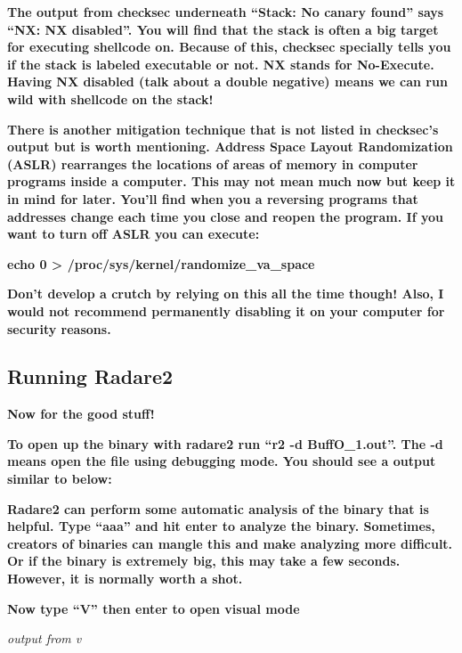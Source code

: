 \documentclass[letterpaper]{article}
\newcommand{\sitfig}[3]{
\begin{figure}[H]
\centering
\makebox[\textwidth][c]{
#2
}
\label{#1}
\end{figure}
}
\newcommand{\sitgfx}[4][scale=1.0]{
\sitfig{#3}{\texttt{[image: \#2]}}{#4}
}
\begin{document}
\textbf{The output from checksec underneath ``Stack: No canary found'' says ``NX: NX disabled''. You will find that the
stack is often a big target for executing shellcode on. Because of this, checksec specially tells you if the stack is
labeled executable or not. NX stands for No-Execute. Having NX disabled (talk about a double negative) means we can run
wild with shellcode on the stack!}

\textbf{There is another mitigation technique that is not listed in checksec's output but is worth mentioning. Address
Space Layout Randomization (ASLR) rearranges the locations of areas of memory in computer programs inside a computer.
This may not mean much now but keep it in mind for later. You'll find when you a reversing programs that addresses
change each time you close and reopen the program. If you want to turn off ASLR you can execute:}

\textbf{echo 0 {\textgreater} /proc/sys/kernel/randomize\_va\_space}

\textbf{Don't develop a crutch by relying on this all the time though! Also, I would not recommend permanently disabling
it on your computer for security reasons.}

\subsection{Running Radare2}

\textbf{Now for the good stuff!}

\textbf{To open up the binary with radare2 run ``r2 -d BuffO\_1.out''. The -d means open the file using debugging mode.
You should see a output similar to below:}

  
\sitgfx[width=5.8335in,height=3.6457in]{reversing-img084.png}{fig:unk}{TODO CAPTION}
 

\textbf{Radare2 can perform some automatic analysis of the binary that is helpful. Type ``aaa'' and hit enter to analyze
the binary. Sometimes, creators of binaries can mangle this and make analyzing more difficult. Or if the binary is
extremely big, this may take a few seconds. However, it is normally worth a shot.}

  
\sitgfx[width=5.8335in,height=3.6457in]{reversing-img075.png}{fig:unk}{TODO CAPTION}
 

\textbf{Now type ``V'' then enter to open visual mode}

  
\sitgfx[width=5.8335in,height=3.6457in]{reversing-img076.png}{fig:unk}{TODO CAPTION}
 

\textit{output from v}
\end{document}
